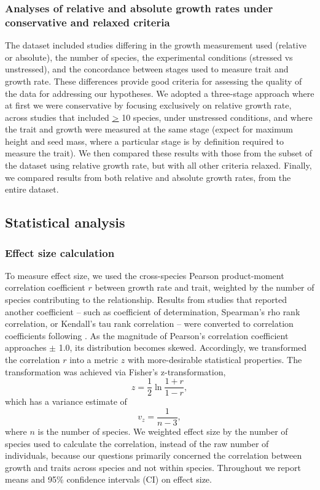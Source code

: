 \documentclass[a4paper,11pt]{article}
\begin{document}
\subsubsection*{Analyses of relative and absolute growth rates under conservative and relaxed criteria}\label{conservative-vs-entire-dataset}

The dataset included studies differing in the growth measurement used (relative or absolute), the number of species, the experimental conditions (stressed vs unstressed), and the concordance between stages used to measure trait and growth rate. These differences provide good criteria for assessing the quality of the data for addressing our hypotheses. We adopted a three-stage approach where at first we were conservative by focusing exclusively on relative growth rate, across studies that included \underline{\textgreater} 10 species, under unstressed conditions, and where the trait and growth were measured at the same stage (expect for maximum height and seed mass, where a particular stage is by definition required to measure the trait). We then compared these results with those from the subset of the dataset using relative growth rate, but with all other criteria relaxed. Finally, we compared results from both relative and absolute growth rates, from the entire dataset. 


\subsection*{Statistical analysis}\label{statistical-analyses}

\subsubsection*{Effect size calculation}\label{effect-size}

To measure effect size, we used the cross-species Pearson product-moment correlation coefficient $r$ between growth rate and trait, weighted by the number of species contributing to the relationship. Results from studies that reported another coefficient -- such as coefficient of determination, Spearman's rho rank correlation, or Kendall's tau rank correlation -- were converted to correlation coefficients following \citet{Lajeunesse:2013tm}. As the magnitude of Pearson's correlation coefficient approaches $\pm$ 1.0, its distribution becomes skewed. Accordingly, we transformed the correlation $r$ into a metric $z$ with more-desirable statistical properties. The transformation was achieved via Fisher's z-transformation,
\[ z = \frac{1}{2} \ln \frac{1+r}{1-r},\]
which has a variance estimate of
\[ v_z= \frac{1}{n-3},\]
where $n$ is the number of species. We weighted effect size by the number of species used to calculate the correlation, instead of the raw number of individuals, because our questions primarily concerned the correlation between growth and traits across species and not within species. Throughout we report means and 95\% confidence intervals (CI) on effect size.
\end{document}
